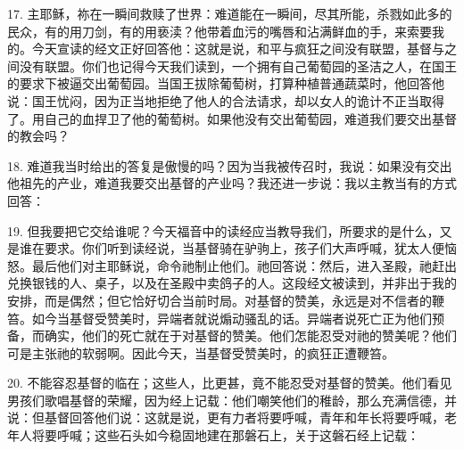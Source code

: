 17. 主耶稣，祢在一瞬间救赎了世界：难道能在一瞬间，尽其所能，杀戮如此多的民众，有的用刀剑，有的用亵渎？他带着血污的嘴唇和沾满鲜血的手，来索要我的。今天宣读的经文正好回答他：这就是说，和平与疯狂之间没有联盟，基督与之间没有联盟。你们也记得今天我们读到，一个拥有自己葡萄园的圣洁之人，在国王的要求下被逼交出葡萄园。当国王拔除葡萄树，打算种植普通蔬菜时，他回答他说：国王忧闷，因为正当地拒绝了他人的合法请求，却以女人的诡计不正当取得了。用自己的血捍卫了他的葡萄树。如果他没有交出葡萄园，难道我们要交出基督的教会吗？\par

18. 难道我当时给出的答复是傲慢的吗？因为当我被传召时，我说：如果没有交出他祖先的产业，难道我要交出基督的产业吗？我还进一步说：我以主教当有的方式回答：\par

19. 但我要把它交给谁呢？今天福音中的读经应当教导我们，所要求的是什么，又是谁在要求。你们听到读经说，当基督骑在驴驹上，孩子们大声呼喊，犹太人便恼怒。最后他们对主耶稣说，命令祂制止他们。祂回答说：然后，进入圣殿，祂赶出兑换银钱的人、桌子，以及在圣殿中卖鸽子的人。这段经文被读到，并非出于我的安排，而是偶然；但它恰好切合当前时局。对基督的赞美，永远是对不信者的鞭笞。如今当基督受赞美时，异端者就说煽动骚乱的话。异端者说死亡正为他们预备，而确实，他们的死亡就在于对基督的赞美。他们怎能忍受对祂的赞美呢？他们可是主张祂的软弱啊。因此今天，当基督受赞美时，的疯狂正遭鞭笞。\par

20. 不能容忍基督的临在；这些人，比更甚，竟不能忍受对基督的赞美。他们看见男孩们歌唱基督的荣耀，因为经上记载：他们嘲笑他们的稚龄，那么充满信德，并说：但基督回答他们说：这就是说，更有力者将要呼喊，青年和年长将要呼喊，老年人将要呼喊；这些石头如今稳固地建在那磐石上，关于这磐石经上记载：\par

